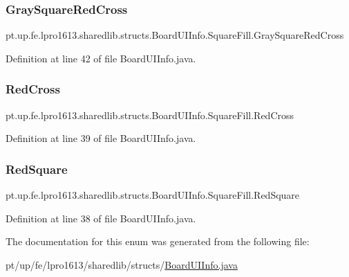 \subsubsection{\texorpdfstring{Gray\+Square\+Red\+Cross}{GraySquareRedCross}}
{\footnotesize\ttfamily pt.\+up.\+fe.\+lpro1613.\+sharedlib.\+structs.\+Board\+U\+I\+Info.\+Square\+Fill.\+Gray\+Square\+Red\+Cross}



Definition at line 42 of file Board\+U\+I\+Info.\+java.

\hypertarget{enumpt_1_1up_1_1fe_1_1lpro1613_1_1sharedlib_1_1structs_1_1_board_u_i_info_1_1_square_fill_a60800ca7444666881227733f477b3294}{}\label{enumpt_1_1up_1_1fe_1_1lpro1613_1_1sharedlib_1_1structs_1_1_board_u_i_info_1_1_square_fill_a60800ca7444666881227733f477b3294} 
\subsubsection{\texorpdfstring{Red\+Cross}{RedCross}}
{\footnotesize\ttfamily pt.\+up.\+fe.\+lpro1613.\+sharedlib.\+structs.\+Board\+U\+I\+Info.\+Square\+Fill.\+Red\+Cross}



Definition at line 39 of file Board\+U\+I\+Info.\+java.

\hypertarget{enumpt_1_1up_1_1fe_1_1lpro1613_1_1sharedlib_1_1structs_1_1_board_u_i_info_1_1_square_fill_a6568ee584324dee1b120ff7069899ac5}{}\label{enumpt_1_1up_1_1fe_1_1lpro1613_1_1sharedlib_1_1structs_1_1_board_u_i_info_1_1_square_fill_a6568ee584324dee1b120ff7069899ac5} 
\subsubsection{\texorpdfstring{Red\+Square}{RedSquare}}
{\footnotesize\ttfamily pt.\+up.\+fe.\+lpro1613.\+sharedlib.\+structs.\+Board\+U\+I\+Info.\+Square\+Fill.\+Red\+Square}



Definition at line 38 of file Board\+U\+I\+Info.\+java.



The documentation for this enum was generated from the following file\+:\begin{DoxyCompactItemize}
\item 
pt/up/fe/lpro1613/sharedlib/structs/\hyperlink{_board_u_i_info_8java}{Board\+U\+I\+Info.\+java}\end{DoxyCompactItemize}
